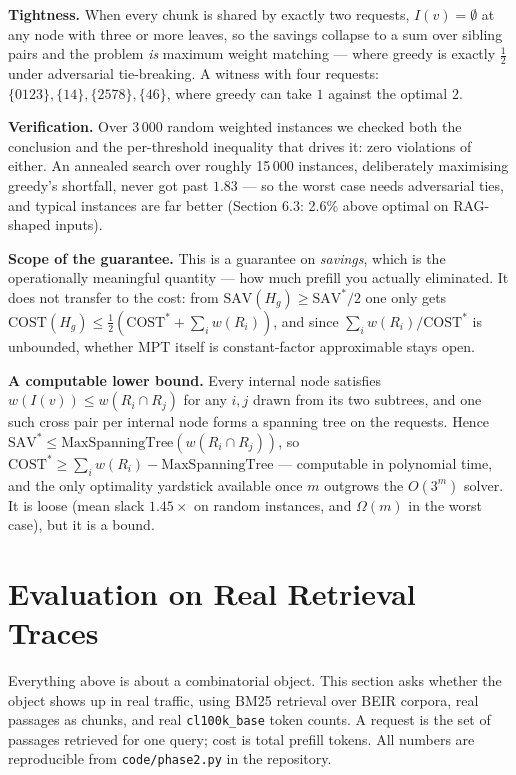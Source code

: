 \documentclass[11pt]{article}
\theoremstyle{plain}
\begin{document}
\textbf{Tightness.} When every chunk is shared by exactly two requests, $I(v) = \emptyset$ at any node with three or more leaves, so the savings collapse to a sum over sibling pairs and the problem \emph{is} maximum weight matching --- where greedy is exactly $\tfrac12$ under adversarial tie-breaking. A witness with four requests: $\{0123\},\{14\},\{2578\},\{46\}$, where greedy can take $1$ against the optimal $2$.

\textbf{Verification.} Over 3\,000 random weighted instances we checked both the conclusion and the per-threshold inequality that drives it: zero violations of either. An annealed search over roughly 15\,000 instances, deliberately maximising greedy's shortfall, never got past $1.83$ --- so the worst case needs adversarial ties, and typical instances are far better (Section 6.3: 2.6\% above optimal on RAG-shaped inputs).

\textbf{Scope of the guarantee.} This is a guarantee on \emph{savings}, which is the operationally meaningful quantity --- how much prefill you actually eliminated. It does not transfer to the cost: from $\mathrm{SAV}(H_g) \ge \mathrm{SAV}^*/2$ one only gets $\mathrm{COST}(H_g) \le \tfrac12(\mathrm{COST}^* + \sum_i w(R_i))$, and since $\sum_i w(R_i)/\mathrm{COST}^*$ is unbounded, whether MPT itself is constant-factor approximable stays open.

\textbf{A computable lower bound.} Every internal node satisfies $w(I(v)) \le w(R_i \cap R_j)$ for any $i,j$ drawn from its two subtrees, and one such cross pair per internal node forms a spanning tree on the requests. Hence $\mathrm{SAV}^* \le \mathrm{MaxSpanningTree}(w(R_i \cap R_j))$, so $\mathrm{COST}^* \ge \sum_i w(R_i) - \mathrm{MaxSpanningTree}$ --- computable in polynomial time, and the only optimality yardstick available once $m$ outgrows the $O(3^m)$ solver. It is loose (mean slack $1.45\times$ on random instances, and $\Omega(m)$ in the worst case), but it is a bound.


\section{Evaluation on Real Retrieval Traces}

Everything above is about a combinatorial object. This section asks whether the object shows up in real traffic, using BM25 retrieval over BEIR corpora, real passages as chunks, and real \texttt{cl100k\_base} token counts. A request is the set of passages retrieved for one query; cost is total prefill tokens. All numbers are reproducible from \texttt{code/phase2.py} in the repository.
\end{document}
